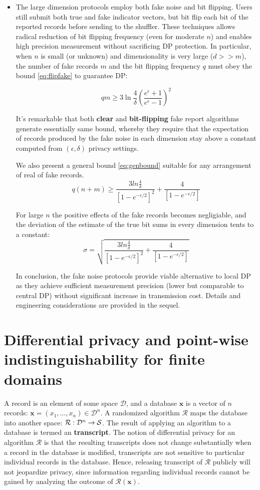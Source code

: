 \documentclass[11pt]{article}
\newcommand{\cR}{\mathcal{R}}
\newcommand{\Dsp}{\mathcal{D}}
\newcommand{\Ssp}{\mathcal{S}}
\newcommand{\xv}{\mathbf{x}}
\begin{document}
\begin{itemize}
\item The large dimension protocols  employ both fake noise and bit flipping.  Users still submit both true and fake indicator vectors, but bit flip each bit of the reported records before sending to the shuffler. These techniques allows radical reduction of bit flipping frequency (even for moderate $n$) and enables high precision measurement without sacrificing DP protection.  In particular, when $n$ is small (or unknown) and dimensionality is very large ($d >> m$), the number of fake records $m$ and the bit flipping frequency $q$ must obey the bound \eqref{eq:flipfake} to guarantee DP:

\[ qm \ge 3\ln{\frac{4}{\delta}} \left (  \frac{e^\epsilon + 1}{e^\epsilon - 1} \right)^2 \label{eq:flipfake} \]

It's remarkable that both \textbf{clear} and \textbf{bit-flipping} fake report algorithms generate essentially same bound, whereby they require that the expectation of records produced by the fake noise in each dimension stay above a constant computed from $(\epsilon,\delta)$ privacy settings.  

We also present a general bound \eqref{eq:genbound} suitable for any arrangement of real of fake records. 
\[ q(n+m) \ge \frac  { 3  ln\frac{4}{\delta}}  { \left [ 1 - e^{-\epsilon/2}\right ] ^2}  + \frac{4}{\left [ 1 - e^{-\epsilon/2}\right ] } \]

For large $n$ the positive effects of the fake records becomes negligiable, and the deviation of the estimate of the true bit sums in every dimension tents to a constant:
\[ \sigma =  \sqrt {  \frac  { 3  ln\frac{4}{\delta}}  { \left [ 1 - e^{-\epsilon/2}\right ] ^2}  + \frac{4}{ \left [ 1 - e^{-\epsilon/2}\right ] } } \]

In conclusion, the fake noise protocols provide viable alternative to local DP as they achieve sufficient measurement precision (lower but  comparable to central DP) without significant increase in transmission cost.  Details and engineering considerations are provided in the sequel.

\end{itemize}

\section{Differential privacy and point-wise indistinguishability for finite domains}
\label{sec:dp}

A record is an element of some space $\Dsp$, and a database $\xv$ is a vector of $n$ records: $\xv = (x_1,\dots,x_n) \in \Dsp^n$.
A randomized algorithm $\cR$ maps the database into another space: $\map{\cR}{\Dsp^n}{\Ssp}$. 
The result of applying an algorithm to a database is termed an \textbf{transcript}.
The notion of differential privacy for an algorithm $\cR$ is that the resulting transcripts does not change substantially when a record in the database is modified,
\ie transcripts are not sensitive to particular individual records in the database.
Hence, releasing transcript of $\cR$ publicly will not jeopardize privacy, since information regarding individual records cannot be gained by analyzing the outcome of $\cR(\xv)$.
\end{document}
